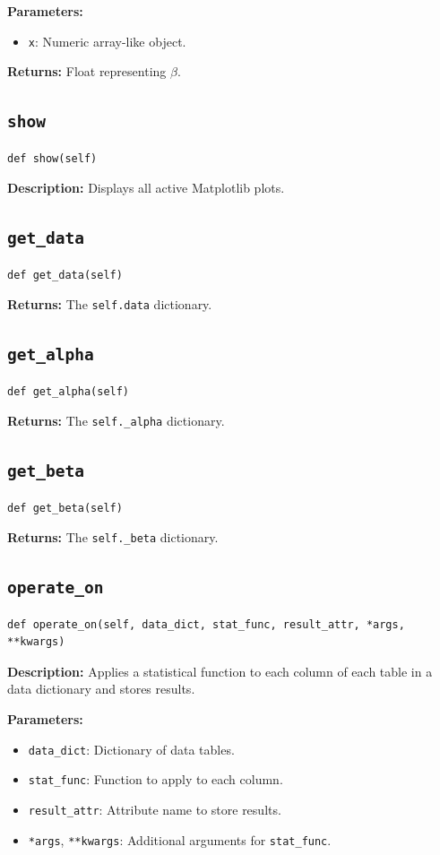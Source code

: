 \documentclass[
	ngerman,							%
	a4paper,							%
	11pt,							%
	oneside							%
	]{article}							%
\begin{document}
\textbf{Parameters:}
\begin{itemize}
    \item \texttt{x}: Numeric array-like object.
\end{itemize}

\textbf{Returns:} Float representing $\beta$.

\subsection{\texttt{show}}
\begin{lstlisting}
def show(self)
\end{lstlisting}
\textbf{Description:} Displays all active Matplotlib plots.

\subsection{\texttt{get\_data}}
\begin{lstlisting}
def get_data(self)
\end{lstlisting}
\textbf{Returns:} The \texttt{self.data} dictionary.

\subsection{\texttt{get\_alpha}}
\begin{lstlisting}
def get_alpha(self)
\end{lstlisting}
\textbf{Returns:} The \texttt{self.\_alpha} dictionary.

\subsection{\texttt{get\_beta}}
\begin{lstlisting}
def get_beta(self)
\end{lstlisting}
\textbf{Returns:} The \texttt{self.\_beta} dictionary.

\subsection{\texttt{operate\_on}}
\begin{lstlisting}
def operate_on(self, data_dict, stat_func, result_attr, *args, **kwargs)
\end{lstlisting}
\textbf{Description:} Applies a statistical function to each column of each table in a data dictionary and stores results.

\textbf{Parameters:}
\begin{itemize}
    \item \texttt{data\_dict}: Dictionary of data tables.
    \item \texttt{stat\_func}: Function to apply to each column.
    \item \texttt{result\_attr}: Attribute name to store results.
    \item \texttt{*args}, \texttt{**kwargs}: Additional arguments for \texttt{stat\_func}.
\end{itemize}
\end{document}
